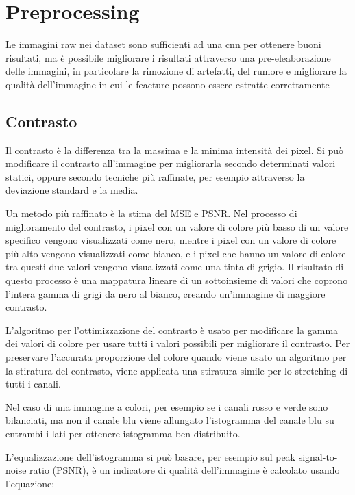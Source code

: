 \chapter{Preprocessing}\label{preprocessing}

Le immagini raw nei dataset sono sufficienti ad una \gls{cnn} per ottenere buoni risultati, ma è possibile migliorare i risultati attraverso una pre-eleaborazione delle immagini, in particolare la rimozione di artefatti,  del rumore e migliorare la qualità dell'immagine 
in cui le feacture  possono essere estratte correttamente \cite{permual_contrast}

\section{Contrasto}\label{contrasto}

Il contrasto è la differenza tra la massima e la minima
intensità dei pixel. Si può modificare il contrasto all'immagine per migliorarla secondo determinati valori statici, oppure secondo tecniche più raffinate, per esempio attraverso la deviazione standard e la media. 

Un metodo più raffinato è la stima del MSE e PSNR. Nel processo di miglioramento del contrasto, i pixel con
un valore di colore più basso di un valore specifico vengono visualizzati come
nero, mentre i pixel con un valore di colore più alto vengono
visualizzati come bianco, e i pixel che hanno un valore di colore tra questi due valori vengono visualizzati come una tinta di grigio.
Il risultato di questo processo è una mappatura lineare di un
sottoinsieme di valori che coprono l'intera gamma di grigi da
nero al bianco, creando un'immagine di maggiore contrasto. 

L'algoritmo per l'ottimizzazione del contrasto è usato per modificare
la gamma dei valori di colore per usare tutti i valori possibili per
migliorare il contrasto. Per preservare l'accurata proporzione del colore
quando viene usato un algoritmo per la  stiratura del contrasto,
viene applicata una stiratura simile per lo stretching di tutti i canali. 

Nel caso di una immagine a colori, per esempio se i canali rosso e verde sono bilanciati, ma non il canale blu viene allungato l'istogramma del canale blu su entrambi i lati per ottenere
istogramma ben distribuito.

L'equalizzazione dell'istogramma si può basare, per esempio sul peak signal-to-noise ratio (PSNR), è un indicatore di qualità dell'immagine è calcolato usando l'equazione:

